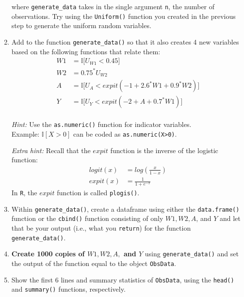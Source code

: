 \documentclass[answers]{exam}
\begin{document}
\begin{enumerate}
where \texttt{generate\_data} takes in the single argument \texttt{n}, the number of observations. Try using the \texttt{Uniform()} function you created in the previous step to generate the uniform random variables.

\item Add to the function \texttt{generate\_data()} so that it also creates 4 new variables based on the following functions that relate them:
\begin{align*}
W1&=\mathbb{I}\big[ U_{W1}<0.45 \big]\\
W2&= 0.75^*U_{W2}\\
A&=\mathbb{I}\big[ U_A < expit(-1+2.6^*W1+0.9^*W2) \big]\\
Y&=\mathbb{I}\big[ U_Y < expit(-2+A+0.7^*W1) \big] \\
\end{align*}

\emph{Hint:} Use the \texttt{as.numeric()} function for indicator variables. \\
Example: $\mathbb{I}[X > 0]$ can be coded as \texttt{as.numeric(X>0)}.

\emph{Extra hint:} Recall that the $expit$ function is the inverse of the logistic function:
\begin{align*}
logit(x) &= log\left(\frac{x}{1-x} \right)\\
expit(x) &=\frac{1}{1+e^{-x}}
 \end{align*}
In \texttt{R}, the $expit$ function is called \texttt{plogis()}.


\item Within \texttt{generate\_data()}, create a dataframe using either the \texttt{data.frame()} function or the \texttt{cbind()} function consisting of only $W1, W2, A$, and $Y$ and let that be your output (i.e., what you \texttt{return}) for the function \texttt{generate\_data()}. 

\item \textbf{Create 1000 copies of $W1, W2, A,$ and $Y$} using \texttt{generate\_data()} and set the output of the function equal to the object \texttt{ObsData}.

\item Show the first 6 lines and summary statistics of \texttt{ObsData}, using the \texttt{head()} and \texttt{summary()} functions, respectively.
\end{enumerate}
\end{document}
